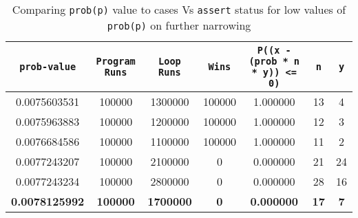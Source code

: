 \documentclass[usenames,dvipsnames,acmsmall]{acmart}
\begin{document}
\begin{table}
	\centering
	\caption{Comparing \texttt{prob(p)} value to cases Vs \texttt{assert} status for low values of \texttt{prob(p)} on further narrowing}
	\label{}
	\begin{tabular}{ c | c | c | c | c | c | c } 
		\toprule
		\texttt{prob-value} & \texttt{Program Runs}& \texttt{Loop Runs} & \texttt{Wins} & \texttt{P((x - (prob * n * y)) <= 0)}  & \texttt{n} & \texttt{y} \\ 
		\hline\hline
		0.0075603531 & 100000 & 1300000 & 100000 & 1.000000 & 13 & 4 \\ \hline
		0.0075963883 & 100000 & 1200000 & 100000 & 1.000000 & 12 & 3 \\ \hline
		0.0076684586 & 100000 & 1100000 & 100000 & 1.000000 & 11 & 2 \\ \hline
		0.0077243207 & 100000 & 2100000 & 0 & 0.000000 & 21 & 24 \\ \hline
		0.0077243234 & 100000 & 2800000 & 0 & 0.000000 & 28 & 16 \\ \hline
	{\textbf{ \color[HTML]{036400} 0.0078125992}} & {\textbf{\color[HTML]{036400} 100000}} & {\textbf{\color[HTML]{036400} 1700000}} & {\textbf{\color[HTML]{036400} 0}} & {\textbf{\color[HTML]{036400} 0.000000}} & {\textbf{\color[HTML]{036400} 17}} & {\textbf{\color[HTML]{036400} 7}} \\ \hline
		\bottomrule
	\end{tabular}
\end{table}
\end{document}
